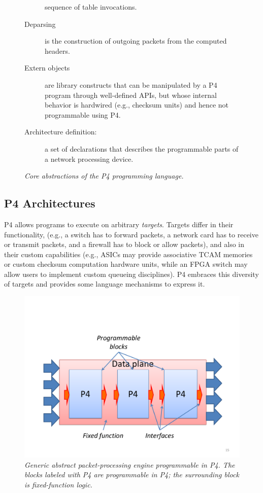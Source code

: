 \begin{figure}[h]
\begin{mdframed}[style=mdstyle]
\begin{description}
  sequence of table invocations.
\item[Deparsing] is the construction of outgoing packets from the
  computed headers.
\item[Extern objects] are library constructs that can be manipulated
  by a P4 program through well-defined APIs, but whose internal
  behavior is hardwired (e.g., checksum units) and hence not
  programmable using P4.
\item[Architecture definition:] a set of declarations that describes
  the programmable parts of a network processing device.
    \end{description}
  \end{mdframed}
  \caption{\sl Core abstractions of the P4 programming language.\label{fig:abstractions}}
\end{figure}

\subsection{P4 Architectures}

P4 allows programs to execute on arbitrary \emph{targets}.  Targets
differ in their functionality, (e.g., a switch has to forward packets,
a network card has to receive or transmit packets, and a firewall has
to block or allow packets), and also in their custom capabilities
(e.g., ASICs may provide associative TCAM memories or custom checksum
computation hardware units, while an FPGA switch may allow users to
implement custom queueing disciplines).  P4 embraces this diversity of
targets and provides some language mechanisms to express it.

\begin{figure}[h]
  \centerline{\includegraphics[width=.5\textwidth,clip,trim=1in 0.9in
      .8in 1.8in]{architecture.pdf}}
  \caption{\sl Generic abstract packet-processing engine programmable
    in P4.  The blocks labeled with P4 are programmable in P4; the
    surrounding block is fixed-function
    logic.\label{fig:architecture}}
\end{figure}

